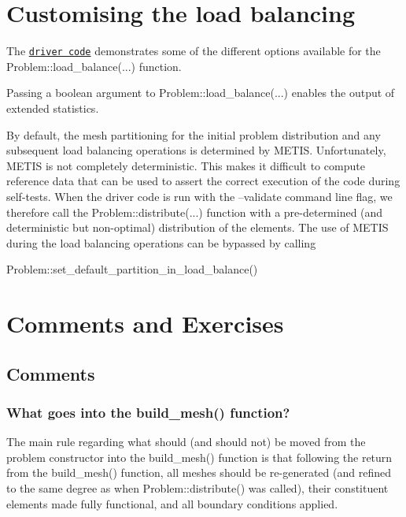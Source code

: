 \hypertarget{index_customising_load_balance}{}\section{Customising the load balancing}\label{index_customising_load_balance}
The \href{../../../../demo_drivers/mpi/distribution/adaptive_driven_cavity/adaptive_driven_cavity_load_balance.cc}{\tt driver code} demonstrates some of the different options available for the {\ttfamily Problem\+::load\+\_\+balance}(...) function.
\begin{DoxyItemize}
\item Passing a boolean argument to {\ttfamily Problem\+::load\+\_\+balance}(...) enables the output of extended statistics. ~\newline
~\newline

\item By default, the mesh partitioning for the initial problem distribution and any subsequent load balancing operations is determined by M\+E\+T\+IS. Unfortunately, M\+E\+T\+IS is not completely deterministic. This makes it difficult to compute reference data that can be used to assert the correct execution of the code during self-\/tests. When the driver code is run with the {\ttfamily --validate} command line flag, we therefore call the {\ttfamily Problem\+::distribute}(...) function with a pre-\/determined (and deterministic but non-\/optimal) distribution of the elements. The use of M\+E\+T\+IS during the load balancing operations can be bypassed by calling 
\begin{DoxyCode}
Problem::set\_default\_partition\_in\_load\_balance()
\end{DoxyCode}

\end{DoxyItemize}



 

\hypertarget{index_comm_and_ex}{}\section{Comments and Exercises}\label{index_comm_and_ex}
\hypertarget{index_comm}{}\subsection{Comments}\label{index_comm}
\hypertarget{index_What}{}\subsubsection{What goes into the build\+\_\+mesh() function?}\label{index_What}
The main rule regarding what should (and should not) be moved from the problem constructor into the {\ttfamily build\+\_\+mesh()} function is that following the return from the {\ttfamily build\+\_\+mesh()} function, all meshes should be re-\/generated (and refined to the same degree as when {\ttfamily Problem\+::distribute()} was called), their constituent elements made fully functional, and all boundary conditions applied.

